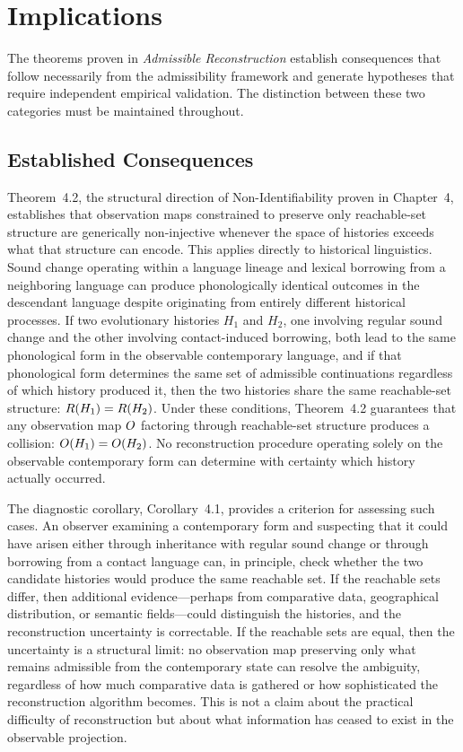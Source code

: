 \chapter{Implications}
\label{ch:essay-implications}

The theorems proven in \emph{Admissible Reconstruction} establish consequences that follow necessarily from the admissibility framework and generate hypotheses that require independent empirical validation. The distinction between these two categories must be maintained throughout.

\section{Established Consequences}

Theorem~4.2, the structural direction of Non-Identifiability proven in Chapter~4, establishes that observation maps constrained to preserve only reachable-set structure are generically non-injective whenever the space of histories exceeds what that structure can encode. This applies directly to historical linguistics. Sound change operating within a language lineage and lexical borrowing from a neighboring language can produce phonologically identical outcomes in the descendant language despite originating from entirely different historical processes. If two evolutionary histories $H_1$ and $H_2$, one involving regular sound change and the other involving contact-induced borrowing, both lead to the same phonological form in the observable contemporary language, and if that phonological form determines the same set of admissible continuations regardless of which history produced it, then the two histories share the same reachable-set structure: $R(H_1) = R(H_2)$. Under these conditions, Theorem~4.2 guarantees that any observation map $O$ factoring through reachable-set structure produces a collision: $O(H_1) = O(H_2)$. No reconstruction procedure operating solely on the observable contemporary form can determine with certainty which history actually occurred.

The diagnostic corollary, Corollary~4.1, provides a criterion for assessing such cases. An observer examining a contemporary form and suspecting that it could have arisen either through inheritance with regular sound change or through borrowing from a contact language can, in principle, check whether the two candidate histories would produce the same reachable set. If the reachable sets differ, then additional evidence—perhaps from comparative data, geographical distribution, or semantic fields—could distinguish the histories, and the reconstruction uncertainty is correctable. If the reachable sets are equal, then the uncertainty is a structural limit: no observation map preserving only what remains admissible from the contemporary state can resolve the ambiguity, regardless of how much comparative data is gathered or how sophisticated the reconstruction algorithm becomes. This is not a claim about the practical difficulty of reconstruction but about what information has ceased to exist in the observable projection.

